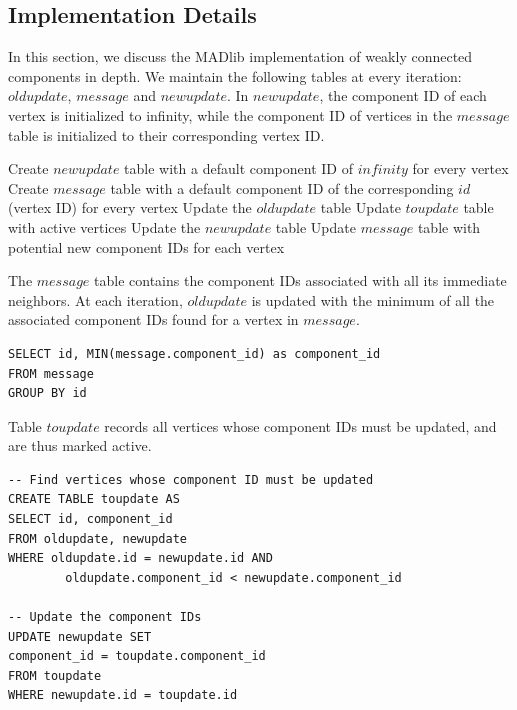 \subsection{Implementation Details} \label{sec:wcc:implementation}

In this section, we discuss the MADlib implementation of weakly connected
components in depth. We maintain the following tables at every iteration:
$oldupdate$, $message$ and $newupdate$. In $newupdate$, the component ID
of each vertex is initialized to infinity, while the component ID of vertices
in the $message$ table is initialized to their corresponding vertex ID.

\begin{algorithm} \label{alg:wcc:high}
\begin{algorithmic}[1]
    \State Create $newupdate$ table with a default component ID of
            $infinity$ for every vertex
    \State Create $message$ table with a default component ID of the
            corresponding $id$ (vertex ID) for every vertex
    \Repeat
        \State Update the $oldupdate$ table
        \State Update $toupdate$ table with active vertices
        \State Update the $newupdate$ table
        \State Update $message$ table with potential new component IDs for each vertex
\end{algorithmic}
\end{algorithm}

The $message$ table contains the component IDs associated with all its
immediate neighbors. At each iteration, $oldupdate$ is updated with the
minimum of all the associated component IDs found for a vertex in $message$.

\begin{algorithm}
\begin{lstlisting}
SELECT id, MIN(message.component_id) as component_id
FROM message
GROUP BY id
\end{lstlisting}
\end{algorithm}

Table $toupdate$ records all vertices whose component IDs must be updated,
and are thus marked active.

\begin{algorithm}
\begin{lstlisting}
-- Find vertices whose component ID must be updated
CREATE TABLE toupdate AS
SELECT id, component_id
FROM oldupdate, newupdate
WHERE oldupdate.id = newupdate.id AND
        oldupdate.component_id < newupdate.component_id

-- Update the component IDs
UPDATE newupdate SET
component_id = toupdate.component_id
FROM toupdate
WHERE newupdate.id = toupdate.id
\end{lstlisting}
\end{algorithm}

